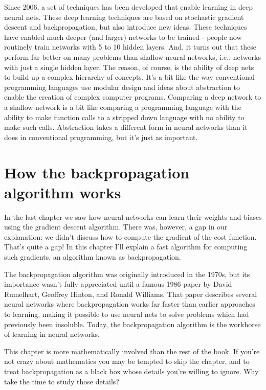 \documentclass[a4paper,12pt]{report}%
\begin{document}
\smallskip

Since 2006, a set of techniques has been developed that enable learning in deep neural nets. These deep learning techniques are based on stochastic gradient descent and backpropagation, but also introduce new ideas. These techniques have enabled much deeper (and larger) networks to be trained - people now routinely train networks with 5 to 10 hidden layers. And, it turns out that these perform far better on many problems than shallow neural networks, i.e., networks with just a single hidden layer. The reason, of course, is the ability of deep nets to build up a complex hierarchy of concepts. It's a bit like the way conventional programming languages use modular design and ideas about abstraction to enable the creation of complex computer programs. Comparing a deep network to a shallow network is a bit like comparing a programming language with the ability to make function calls to a stripped down language with no ability to make such calls. Abstraction takes a different form in neural networks than it does in conventional programming, but it's just as important.




\chapter{\color{IAF} \bf How the backpropagation algorithm works}

In the last chapter we saw how neural networks can learn their weights and biases using the gradient descent algorithm. There was, however, a gap in our explanation: we didn't discuss how to compute the gradient of the cost function. That's quite a gap! In this chapter I'll explain a fast algorithm for computing such gradients, an algorithm known as backpropagation.

\smallskip

The backpropagation algorithm was originally introduced in the 1970s, but its importance wasn't fully appreciated until a famous 1986 paper by David Rumelhart, Geoffrey Hinton, and Ronald Williams. That paper describes several neural networks where backpropagation works far faster than earlier approaches to learning, making it possible to use neural nets to solve problems which had previously been insoluble. Today, the backpropagation algorithm is the workhorse of learning in neural networks.

\smallskip

This chapter is more mathematically involved than the rest of the book. If you're not crazy about mathematics you may be tempted to skip the chapter, and to treat backpropagation as a black box whose details you're willing to ignore. Why take the time to study those details?
\end{document}
